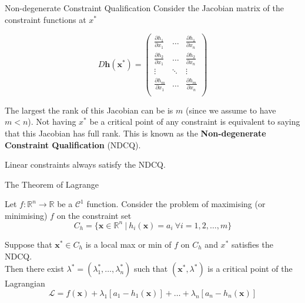 \documentclass[11pt, xcolor={dvipsnames}, hyperref={colorlinks, allcolors=Blue}]{beamer}
\newcommand\bc[1]{{\usebeamercolor[fg]{frametitle} {\textbf{#1}}}} %
\newcommand{\into}{\rightarrow}
\newcommand{\R}{\mathbb{R}}
\newcommand{\h}{\mathbf{h}}
\newcommand{\x}{\mathbf{x}}
\begin{document}
\begin{frame}{Non-degenerate Constraint Qualification}
Consider the Jacobian matrix of the constraint functions at $x^{*}$
\bigskip

\large
\[
\renewcommand{\arraystretch}{1.3}
D\h(\x^{*}) = 
\begin{pmatrix}
\frac{\partial h_{1}}{\partial x_{1}}  &  \dots &  \frac{\partial h_{1}}{\partial x_{n}}\\
\frac{\partial h_{2}}{\partial x_{1}} & \dots & \frac{\partial h_{2}}{\partial x_{n}}\\
\vdots & \ddots & \vdots\\
\frac{\partial h_{m}}{\partial x_{1}} & \dots & \frac{\partial h_{m}}{\partial x_{n}}\\
\end{pmatrix}
\]
\normalsize
\bigskip

The largest the rank of this Jacobian can be is $m$ (since we assume to have $m < n$). Not having $x^{*}$ be a critical point of any constraint is equivalent to saying that this Jacobian has full rank. This is known as the \bc{Non-degenerate Constraint Qualification} (NDCQ).\bigskip

Linear constraints always satisfy the NDCQ.

\end{frame}

\begin{frame}{The Theorem of Lagrange}

\begin{theorem}
Let $f:\R^{n}\into \R$ be a $\mathcal{C}^{1}$ function. Consider the problem of maximising (or minimising) $f$ on the constraint set
\[C_{h} = \{\x \in \R^{n} \ | \ h_{i}(\x) = a_{i} \  \forall i = 1,2,\dots,m\}\]

Suppose that $\x^{*} \in C_{h}$ is a local max or min of $f$ on $C_{h}$ and $x^{*}$ satisfies the NDCQ. \\

Then there exist $\lambda^{*} = (\lambda_{1}^{*},\dots, \lambda_{n}^{*})$ such that $(\x^{*}, \lambda^{*})$ is a critical point of the Lagrangian
\[ \mathcal{L} = f(\x) + \lambda_{1} \left [ a_{1} - h_{1}(\x)\right] + \dots + \lambda_{n} \left [ a_{n} - h_{n}(\x)\right] \]
\end{theorem}


\end{frame}
\end{document}
